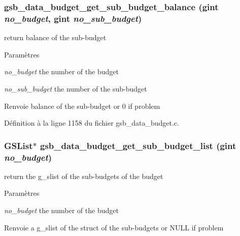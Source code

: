 \subsubsection[{gsb\_\-data\_\-budget\_\-get\_\-sub\_\-budget\_\-balance}]{ gsb\_\-data\_\-budget\_\-get\_\-sub\_\-budget\_\-balance (gint {\em no\_\-budget}, \/  gint {\em no\_\-sub\_\-budget})}\label{gsb__data__budget_8c_a6585ddd55f0d3b807f5319250c115ec7}
return balance of the sub-\/budget


\begin{DoxyParams}{Paramètres}
\item[{\em no\_\-budget}]the number of the budget \item[{\em no\_\-sub\_\-budget}]the number of the sub-\/budget\end{DoxyParams}
\begin{DoxyReturn}{Renvoie}
balance of the sub-\/budget or 0 if problem 
\end{DoxyReturn}


Définition à la ligne 1158 du fichier gsb\_\-data\_\-budget.c.

\subsubsection[{gsb\_\-data\_\-budget\_\-get\_\-sub\_\-budget\_\-list}]{\setlength{\rightskip}{0pt plus 5cm}GSList$\ast$ gsb\_\-data\_\-budget\_\-get\_\-sub\_\-budget\_\-list (gint {\em no\_\-budget})}\label{gsb__data__budget_8c_a6bc99abfd66c75159af15d6531c3677e}
return the g\_\-slist of the sub-\/budgets of the budget


\begin{DoxyParams}{Paramètres}
\item[{\em no\_\-budget}]the number of the budget\end{DoxyParams}
\begin{DoxyReturn}{Renvoie}
a g\_\-slist of the struct of the sub-\/budgets or NULL if problem 
\end{DoxyReturn}


